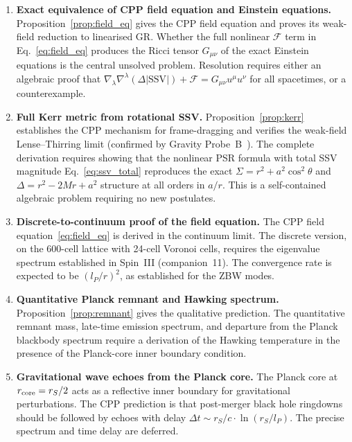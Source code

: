 \documentclass[12pt]{article}
\newcommand{\lP}{l_P}
\newcommand{\SSV}{\text{SSV}}
\begin{document}
\begin{enumerate}
  \item \label{op:einstein}
    \textbf{Exact equivalence of CPP field equation and Einstein equations.}
    Proposition~\ref{prop:field_eq} gives the CPP field equation and
    proves its weak-field reduction to linearised GR.  Whether the
    full nonlinear $\mathcal{F}$ term in Eq.~\eqref{eq:field_eq}
    produces the Ricci tensor $G_{\mu\nu}$ of the exact Einstein
    equations is the central unsolved problem.  Resolution requires
    either an algebraic proof that
    $\nabla_\lambda\nabla^\lambda(\Delta|\SSV|) + \mathcal{F} =
    G_{\mu\nu}u^\mu u^\nu$ for all spacetimes, or a counterexample.

  \item \label{op:kerr}
    \textbf{Full Kerr metric from rotational SSV.}
    Proposition~\ref{prop:kerr} establishes the CPP mechanism for
    frame-dragging and verifies the weak-field Lense--Thirring limit
    (confirmed by Gravity Probe~B~\cite{everitt2011}).
    The complete derivation requires showing that the nonlinear PSR
    formula with total SSV magnitude Eq.~\eqref{eq:ssv_total}
    reproduces the exact $\Sigma = r^2 + a^2\cos^2\theta$ and
    $\Delta = r^2 - 2Mr + a^2$ structure at all orders in $a/r$.
    This is a self-contained algebraic problem requiring no new
    postulates.

  \item \label{op:24cell}
    \textbf{Discrete-to-continuum proof of the field equation.}
    The CPP field equation~\eqref{eq:field_eq} is derived in the
    continuum limit.  The discrete version, on the 600-cell lattice
    with 24-cell Voronoi cells, requires the eigenvalue spectrum
    established in Spin~III (companion~11).  The convergence rate
    is expected to be $({\lP}/r)^2$, as established for the ZBW
    modes.

  \item \label{op:hawking}
    \textbf{Quantitative Planck remnant and Hawking spectrum.}
    Proposition~\ref{prop:remnant} gives the qualitative prediction.
    The quantitative remnant mass, late-time emission spectrum, and
    departure from the Planck blackbody spectrum require a derivation
    of the Hawking temperature in the presence of the Planck-core
    inner boundary condition.

  \item \label{op:echoes}
    \textbf{Gravitational wave echoes from the Planck core.}
    The Planck core at $r_{\rm core} = r_S/2$ acts as a reflective
    inner boundary for gravitational perturbations.  The CPP prediction
    is that post-merger black hole ringdowns should be followed by
    echoes with delay $\Delta t \sim r_S/c \cdot \ln(r_S/\lP)$.
    The precise spectrum and time delay are deferred.
\end{enumerate}
\end{document}
